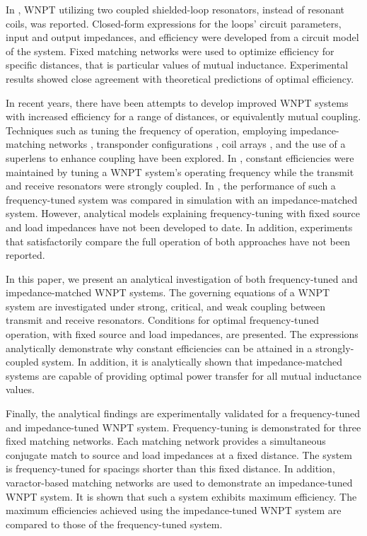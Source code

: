 \documentclass[journal]{IEEEtran}
\begin{document}
In \cite{Thomas, Thomas2}, WNPT utilizing two coupled shielded-loop resonators, instead of resonant coils, was reported. Closed-form expressions for the loops' circuit parameters, input and output impedances, and efficiency were developed from a circuit model of the system. Fixed matching networks were used to optimize efficiency for specific distances, that is particular values of mutual inductance. Experimental results showed close agreement with theoretical predictions of optimal efficiency.

In recent years, there have been attempts to develop improved WNPT systems with increased efficiency for a range of distances, or equivalently mutual coupling. Techniques such as tuning the frequency of operation, employing impedance-matching networks \cite{MatchingNet1, MatchingNet2, Multireceive}, transponder configurations \cite{Mauro, CritReview}, coil arrays \cite{PhasedArray}, and the use of a superlens to enhance coupling \cite{Superlens} have been explored. In \cite{Intel,Korea,VehicalPower}, constant efficiencies were maintained by tuning a WNPT system's operating frequency while the transmit and receive resonators were strongly coupled. In \cite{FreqTune-Exp}, the performance of such a frequency-tuned system was compared in simulation with an impedance-matched system. However, analytical models explaining frequency-tuning with fixed source and load impedances have not been developed to date. In addition, experiments that satisfactorily compare the full operation of both approaches have not been reported.

In this paper, we present an analytical investigation of both frequency-tuned and impedance-matched WNPT systems. The governing equations of a WNPT system are investigated under strong, critical, and weak coupling between transmit and receive resonators. Conditions for optimal frequency-tuned operation, with fixed source and load impedances, are presented. The expressions analytically demonstrate why constant efficiencies can be attained in a strongly-coupled system. In addition, it is analytically shown that impedance-matched systems are capable of providing optimal power transfer for all mutual inductance values.

Finally, the analytical findings are experimentally validated for a frequency-tuned and impedance-tuned WNPT system. Frequency-tuning is demonstrated for three fixed matching networks. Each matching network provides a simultaneous conjugate match to source and load impedances at a fixed distance. The system is frequency-tuned for spacings shorter than this fixed distance. In addition, varactor-based matching networks are used to demonstrate an impedance-tuned WNPT system. It is shown that such a system exhibits maximum efficiency. The maximum efficiencies achieved using the impedance-tuned WNPT system  are compared to those of the frequency-tuned system.
\end{document}

